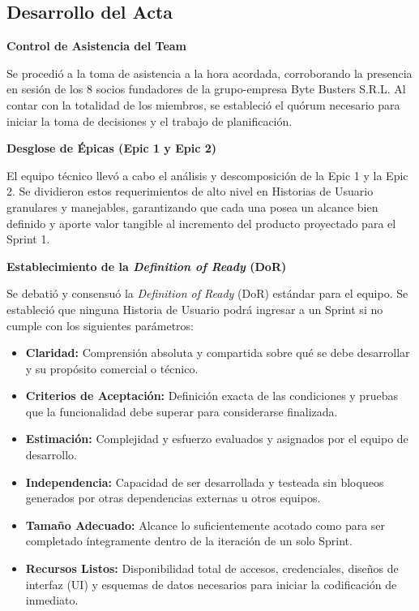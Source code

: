 \newpage
\subsection{Desarrollo del Acta}

\noindent \textbf{Control de Asistencia del Team}\par
Se procedió a la toma de asistencia a la hora acordada, corroborando la presencia en sesión de los 8 socios fundadores de la grupo-empresa Byte Busters S.R.L. Al contar con la totalidad de los miembros, se estableció el quórum necesario para iniciar la toma de decisiones y el trabajo de planificación.

\vspace*{0.5cm}
\noindent\textbf{Desglose de Épicas (Epic 1 y Epic 2)}\par
El equipo técnico llevó a cabo el análisis y descomposición de la Epic 1 y la Epic 2. Se dividieron estos requerimientos de alto nivel en Historias de Usuario granulares y manejables, garantizando que cada una posea un alcance bien definido y aporte valor tangible al incremento del producto proyectado para el Sprint 1.

\vspace*{0.5cm}
\noindent \textbf{Establecimiento de la \textit{Definition of Ready} (DoR)}\par
Se debatió y consensuó la \textit{Definition of Ready} (DoR) estándar para el equipo. Se estableció que ninguna Historia de Usuario podrá ingresar a un Sprint si no cumple con los siguientes parámetros:
\begin{itemize}[noitemsep]
    \item \textbf{Claridad:} Comprensión absoluta y compartida sobre qué se debe desarrollar y su propósito comercial o técnico.
    \item \textbf{Criterios de Aceptación:} Definición exacta de las condiciones y pruebas que la funcionalidad debe superar para considerarse finalizada.
    \item \textbf{Estimación:} Complejidad y esfuerzo evaluados y asignados por el equipo de desarrollo.
    \item \textbf{Independencia:} Capacidad de ser desarrollada y testeada sin bloqueos generados por otras dependencias externas u otros equipos.
    \item \textbf{Tamaño Adecuado:} Alcance lo suficientemente acotado como para ser completado íntegramente dentro de la iteración de un solo Sprint.
    \item \textbf{Recursos Listos:} Disponibilidad total de accesos, credenciales, diseños de interfaz (UI) y esquemas de datos necesarios para iniciar la codificación de inmediato.
\end{itemize}


